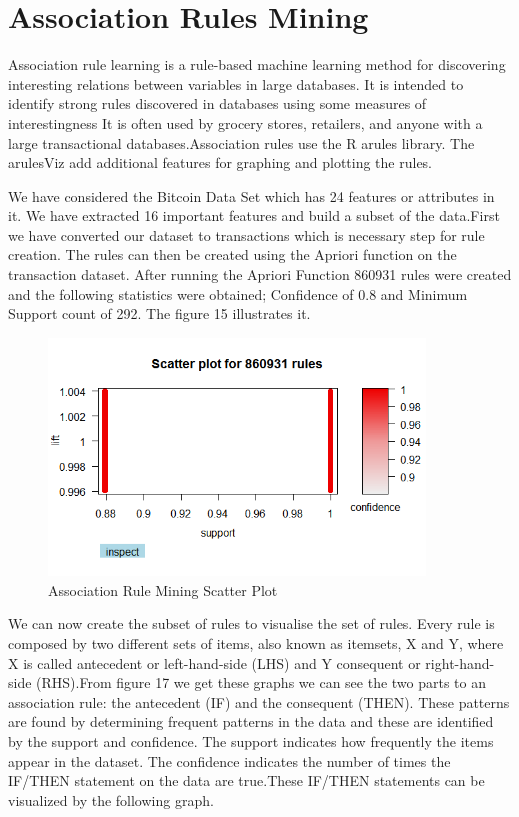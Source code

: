 \documentclass{article}
\begin{document}
\section{Association Rules Mining}
Association rule learning is a rule-based machine learning method for discovering interesting relations between variables in large databases. It is intended to identify strong rules discovered in databases using some measures of interestingness It is often used by grocery stores, retailers, and anyone with a large transactional databases.Association rules use the R arules library. The arulesViz add additional features for graphing and plotting the rules. 

We have considered the Bitcoin Data Set which has 24 features or attributes in it. We have extracted 16 important features and build a subset of the data.First we have converted our dataset to transactions which is necessary step for rule creation. The rules can then be created using the Apriori function on the transaction dataset. After running the Apriori Function 860931 rules were created and the following statistics were obtained; Confidence of 0.8 and Minimum Support count of 292. The figure 15 illustrates it. \newline

\begin{figure}[h]
    \centering
    \includegraphics[width=10cm]{RuleMiningScatterPlotFig9.png}
    \caption{ Association Rule Mining Scatter Plot }
    \label{fig:my_label}
\end{figure}

 We can now create the subset of rules to visualise the set of rules. Every rule is composed by two different sets of items, also known as itemsets,  X and Y, where X is called antecedent or left-hand-side (LHS) and Y consequent or right-hand-side (RHS).From figure 17 we get these graphs we can see the two parts to an association rule: the antecedent (IF) and the consequent (THEN).  These patterns are found by determining frequent patterns in the data and these are identified by the support and confidence.  The support indicates how frequently the items appear in the dataset. The confidence indicates the number of times the IF/THEN statement on the data are true.These IF/THEN statements can be visualized by the following graph. \newline
\end{document}
